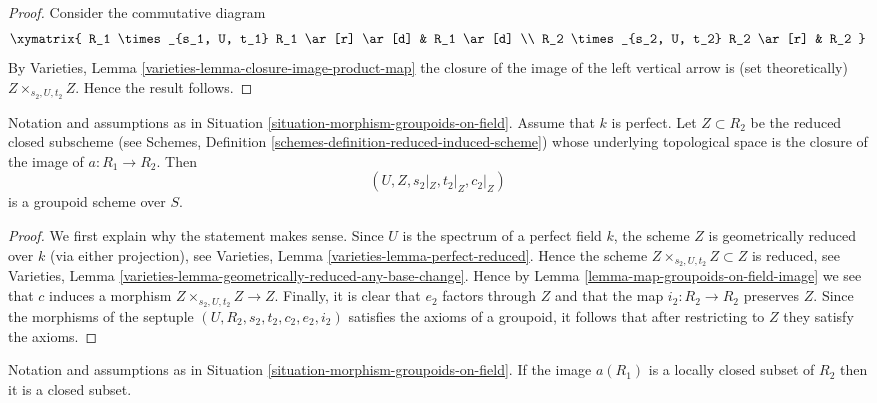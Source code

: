 \begin{proof}
Consider the commutative diagram
$$
\xymatrix{
R_1 \times_{s_1, U, t_1} R_1 \ar[r] \ar[d] & R_1 \ar[d] \\
R_2 \times_{s_2, U, t_2} R_2 \ar[r] & R_2
}
$$
By
Varieties, Lemma \ref{varieties-lemma-closure-image-product-map}
the closure of the image of the left vertical arrow is (set theoretically)
$Z \times_{s_2, U, t_2} Z$.
Hence the result follows.
\end{proof}

\begin{lemma}
\label{lemma-map-groupoids-on-perfect-field-image}
Notation and assumptions as in
Situation \ref{situation-morphism-groupoids-on-field}.
Assume that $k$ is perfect.
Let $Z \subset R_2$ be the reduced closed subscheme (see
Schemes, Definition \ref{schemes-definition-reduced-induced-scheme})
whose underlying topological space is the closure of the image of
$a : R_1 \to R_2$. Then
$$
(U, Z, s_2|_Z, t_2|_Z, c_2|_Z)
$$
is a groupoid scheme over $S$.
\end{lemma}

\begin{proof}
We first explain why the statement makes sense. Since $U$ is the spectrum
of a perfect field $k$, the scheme $Z$ is geometrically reduced
over $k$ (via either projection), see
Varieties, Lemma \ref{varieties-lemma-perfect-reduced}.
Hence the scheme $Z \times_{s_2, U, t_2} Z \subset Z$
is reduced, see
Varieties, Lemma \ref{varieties-lemma-geometrically-reduced-any-base-change}.
Hence by
Lemma \ref{lemma-map-groupoids-on-field-image}
we see that $c$ induces a morphism
$Z \times_{s_2, U, t_2} Z \to Z$.
Finally, it is clear that $e_2$ factors through $Z$
and that the map $i_2 : R_2 \to R_2$ preserves $Z$. Since the morphisms
of the septuple
$(U, R_2, s_2, t_2, c_2, e_2, i_2)$
satisfies the axioms of a groupoid, it follows that after restricting
to $Z$ they satisfy the axioms.
\end{proof}

\begin{lemma}
\label{lemma-locally-closed-image-is-closed}
Notation and assumptions as in
Situation \ref{situation-morphism-groupoids-on-field}.
If the image $a(R_1)$ is a locally closed subset of $R_2$
then it is a closed subset.
\end{lemma}

